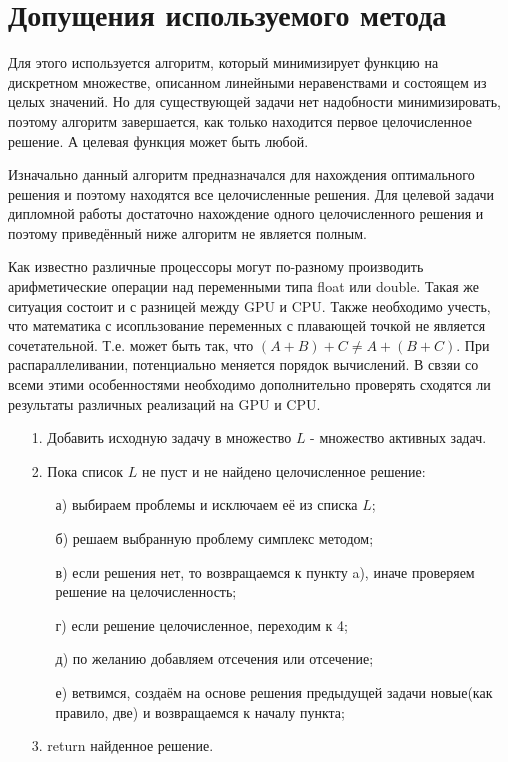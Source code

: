 \documentclass[a4paper,14pt,russian]{extreport}
\begin{document}
\section{Допущения используемого метода}

Для этого используется алгоритм, который минимизирует функцию на дискретном множестве, описанном линейными неравенствами и состоящем из целых значений. Но для существующей задачи нет надобности минимизировать, поэтому алгоритм завершается, как только находится первое целочисленное решение. А целевая функция может быть любой. 
\par
Изначально данный алгоритм предназначался для нахождения оптимального решения и поэтому находятся все целочисленные решения. Для целевой задачи дипломной работы достаточно нахождение одного целочисленного решения и поэтому приведённый ниже алгоритм не является полным. 
\par
Как известно различные процессоры могут по-разному производить арифметические операции над переменными типа float или double. Такая же ситуация состоит и с разницей между GPU и CPU. Также необходимо учесть, что математика с исопльзование переменных с плавающей точкой не является сочетательной. Т.е. может быть так, что $(A+B)+C\neq A+(B+C)$. При распараллеливании, потенциально меняется порядок вычислений. В свзяи со всеми этими особенностями необходимо дополнительно проверять сходятся ли результаты различных реализаций на GPU и CPU. 
\par

\begin{enumerate}
\item[1.]
Добавить исходную задачу в множество $L$ - множество активных задач.
\item[2.]
Пока список $L$ не пуст и не найдено целочисленное решение:
\begin{enumerate}
\item[а)] выбираем проблемы и исключаем её из списка $L$;
\item[б)] решаем выбранную проблему симплекс методом;
\item[в)] если решения нет, то возвращаемся к пункту a), иначе проверяем решение на целочисленность;
\item[г)] если решение целочисленное, переходим к 4;
\item[д)] по желанию добавляем отсечения или отсечение;
\item[е)] ветвимся, создаём на основе решения предыдущей задачи новые(как правило, две) и возвращаемся к началу пункта;
\end{enumerate}
\item[3.] return найденное решение.
\end{enumerate}
\end{document}
